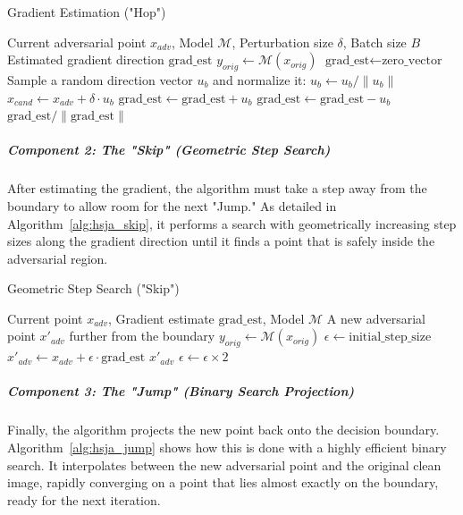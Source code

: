 \documentclass[../main.tex]{subfiles}
\begin{document}
\begin{breakablealgorithm}{Gradient Estimation ("Hop")}
\label{alg:hsja_hop}
\begin{algorithmic}[1]
\Require Current adversarial point $x_{adv}$, Model $\mathcal{M}$, Perturbation size $\delta$, Batch size $B$
\Ensure Estimated gradient direction $\text{grad\_est}$
\State $y_{orig} \gets \mathcal{M}(x_{orig})$
\State $\text{grad\_est} \gets \text{zero\_vector}$
    \State Sample a random direction vector $u_b$ and normalize it: $u_b \gets u_b / \|u_b\|$
    \State $x_{cand} \gets x_{adv} + \delta \cdot u_b$
        \State $\text{grad\_est} \gets \text{grad\_est} + u_b$
    \Else
        \State $\text{grad\_est} \gets \text{grad\_est} - u_b$
    \EndIf
\EndFor
\State \Return $\text{grad\_est} / \|\text{grad\_est}\|$
\end{algorithmic}
\end{breakablealgorithm}

\subparagraph{Component 2: The "Skip" (Geometric Step Search)}
After estimating the gradient, the algorithm must take a step away from the boundary to allow room for the next "Jump." As detailed in Algorithm~\ref{alg:hsja_skip}, it performs a search with geometrically increasing step sizes along the gradient direction until it finds a point that is safely inside the adversarial region.

\begin{breakablealgorithm}{Geometric Step Search ("Skip")}
\label{alg:hsja_skip}
\begin{algorithmic}[1]
\Require Current point $x_{adv}$, Gradient estimate $\text{grad\_est}$, Model $\mathcal{M}$
\Ensure A new adversarial point $x'_{adv}$ further from the boundary
\State $y_{orig} \gets \mathcal{M}(x_{orig})$
\State $\epsilon \gets \text{initial\_step\_size}$
\Loop
    \State $x'_{adv} \gets x_{adv} + \epsilon \cdot \text{grad\_est}$
        \State \Return $x'_{adv}$ 
    \EndIf
    \State $\epsilon \gets \epsilon \times 2$ 
\EndLoop
\end{algorithmic}
\end{breakablealgorithm}

\subparagraph{Component 3: The "Jump" (Binary Search Projection)}
Finally, the algorithm projects the new point back onto the decision boundary. Algorithm~\ref{alg:hsja_jump} shows how this is done with a highly efficient binary search. It interpolates between the new adversarial point and the original clean image, rapidly converging on a point that lies almost exactly on the boundary, ready for the next iteration.
\end{document}

